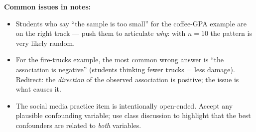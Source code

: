 \documentclass[10pt]{article}
\begin{document}
\begin{teachernote}
\textbf{Common issues in notes:}
\begin{itemize}[itemsep=3pt]
  \item Students who say ``the sample is too small'' for the coffee-GPA example are on the right track
        --- push them to articulate \emph{why}: with $n=10$ the pattern is very likely random.
  \item For the fire-trucks example, the most common wrong answer is ``the association is negative''
        (students thinking fewer trucks = less damage). Redirect: the \emph{direction} of the observed
        association is positive; the issue is what causes it.
  \item The social media practice item is intentionally open-ended. Accept any plausible confounding
        variable; use class discussion to highlight that the best confounders are related to \emph{both} variables.
\end{itemize}
\end{teachernote}
\end{document}
